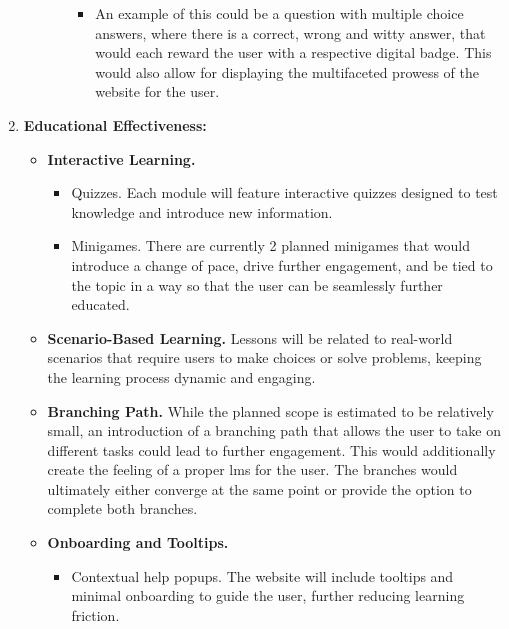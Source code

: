 \begin{enumerate}
\begin{itemize}
\begin{itemize}
\begin{itemize}
                \item An example of this could be a question with multiple choice answers, where there is a correct, wrong and witty answer, that would each reward the user with a respective digital badge. This would also allow for displaying the multifaceted prowess of the website for the user.
            \end{itemize}
        \end{itemize}
    \end{itemize}
    \item \textbf{Educational Effectiveness:}
    \begin{itemize}
        \item \textbf{Interactive Learning.}
        \begin{itemize}
            \item Quizzes. Each module will feature interactive quizzes designed to test knowledge and introduce new information.
            \item Minigames. There are currently 2 planned minigames that would introduce a change of pace, drive further engagement, and be tied to the topic in a way so that the user can be seamlessly further educated.
        \end{itemize}
        \item \textbf{Scenario-Based Learning.} Lessons will be related to real-world scenarios that require users to make choices or solve problems, keeping the learning process dynamic and engaging.
        \item \textbf{Branching Path.} While the planned scope is estimated to be relatively small, an introduction of a branching path that allows the user to take on different tasks could lead to further engagement. 
        This would additionally create the feeling of a proper \acrshort{lms} for the user. 
        The branches would ultimately either converge at the same point or provide the option to complete both branches.
        \item \textbf{Onboarding and Tooltips.}
        \begin{itemize}
            \item Contextual help popups. The website will include tooltips and minimal onboarding to guide the user, further reducing learning friction.
        \end{itemize}
    \end{itemize}

\end{enumerate}
